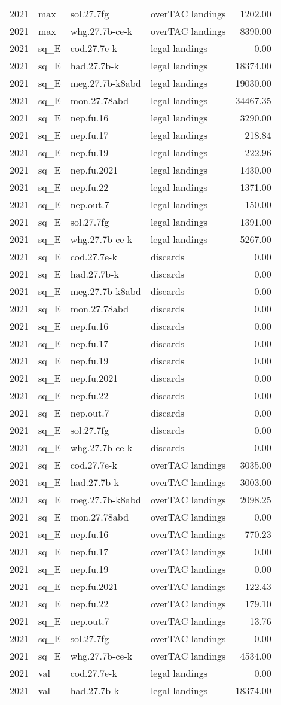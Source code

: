 \documentclass[
]{article}
\begin{document}
\begin{longtable}[]{@{}llllr@{}}
2021 & max & sol.27.7fg & overTAC landings & 1202.00\tabularnewline
2021 & max & whg.27.7b-ce-k & overTAC landings & 8390.00\tabularnewline
2021 & sq\_E & cod.27.7e-k & legal landings & 0.00\tabularnewline
2021 & sq\_E & had.27.7b-k & legal landings & 18374.00\tabularnewline
2021 & sq\_E & meg.27.7b-k8abd & legal landings &
19030.00\tabularnewline
2021 & sq\_E & mon.27.78abd & legal landings & 34467.35\tabularnewline
2021 & sq\_E & nep.fu.16 & legal landings & 3290.00\tabularnewline
2021 & sq\_E & nep.fu.17 & legal landings & 218.84\tabularnewline
2021 & sq\_E & nep.fu.19 & legal landings & 222.96\tabularnewline
2021 & sq\_E & nep.fu.2021 & legal landings & 1430.00\tabularnewline
2021 & sq\_E & nep.fu.22 & legal landings & 1371.00\tabularnewline
2021 & sq\_E & nep.out.7 & legal landings & 150.00\tabularnewline
2021 & sq\_E & sol.27.7fg & legal landings & 1391.00\tabularnewline
2021 & sq\_E & whg.27.7b-ce-k & legal landings & 5267.00\tabularnewline
2021 & sq\_E & cod.27.7e-k & discards & 0.00\tabularnewline
2021 & sq\_E & had.27.7b-k & discards & 0.00\tabularnewline
2021 & sq\_E & meg.27.7b-k8abd & discards & 0.00\tabularnewline
2021 & sq\_E & mon.27.78abd & discards & 0.00\tabularnewline
2021 & sq\_E & nep.fu.16 & discards & 0.00\tabularnewline
2021 & sq\_E & nep.fu.17 & discards & 0.00\tabularnewline
2021 & sq\_E & nep.fu.19 & discards & 0.00\tabularnewline
2021 & sq\_E & nep.fu.2021 & discards & 0.00\tabularnewline
2021 & sq\_E & nep.fu.22 & discards & 0.00\tabularnewline
2021 & sq\_E & nep.out.7 & discards & 0.00\tabularnewline
2021 & sq\_E & sol.27.7fg & discards & 0.00\tabularnewline
2021 & sq\_E & whg.27.7b-ce-k & discards & 0.00\tabularnewline
2021 & sq\_E & cod.27.7e-k & overTAC landings & 3035.00\tabularnewline
2021 & sq\_E & had.27.7b-k & overTAC landings & 3003.00\tabularnewline
2021 & sq\_E & meg.27.7b-k8abd & overTAC landings &
2098.25\tabularnewline
2021 & sq\_E & mon.27.78abd & overTAC landings & 0.00\tabularnewline
2021 & sq\_E & nep.fu.16 & overTAC landings & 770.23\tabularnewline
2021 & sq\_E & nep.fu.17 & overTAC landings & 0.00\tabularnewline
2021 & sq\_E & nep.fu.19 & overTAC landings & 0.00\tabularnewline
2021 & sq\_E & nep.fu.2021 & overTAC landings & 122.43\tabularnewline
2021 & sq\_E & nep.fu.22 & overTAC landings & 179.10\tabularnewline
2021 & sq\_E & nep.out.7 & overTAC landings & 13.76\tabularnewline
2021 & sq\_E & sol.27.7fg & overTAC landings & 0.00\tabularnewline
2021 & sq\_E & whg.27.7b-ce-k & overTAC landings &
4534.00\tabularnewline
2021 & val & cod.27.7e-k & legal landings & 0.00\tabularnewline
2021 & val & had.27.7b-k & legal landings & 18374.00\tabularnewline

\end{longtable}
\end{document}
